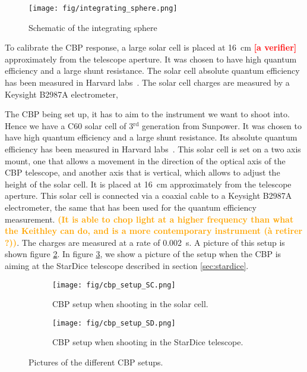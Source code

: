 \documentclass[onecolumn]{aa}
\newcommand{\todo}[1]{\textbf{\textcolor{red}{[#1]}}\xspace}
\newcommand{\com}[1]{\textbf{\textcolor{orange}{(#1)}}\xspace}
\begin{document}
\begin{figure}[h]
    \centering
    \texttt{[image: fig/integrating\_sphere.png]}
    \caption{Schematic of the integrating sphere}
    \label{fig:sphere}
\end{figure}

To calibrate the CBP response, a large solar cell is placed at \SI{16}{\cm} \todo{a verifier} approximately from the telescope aperture. It was chosen to have high quantum efficiency and a large shunt resistance. The solar cell absolute quantum efficiency has been measured in Harvard labs~\cite{solarcell}. The solar cell charges are measured by a Keysight B2987A electrometer,

The CBP being set up, it has to aim to the instrument we want to shoot into. Hence we have a C60 solar cell of 3$^{\mathrm{rd}}$ generation from Sunpower. It was chosen to have high quantum efficiency and a large shunt resistance. Its absolute quantum efficiency has been measured in Harvard labs~\cite{solarcell}. This solar cell is set on a two axis mount, one that allows a movement in the direction of the optical axis of the CBP telescope, and another axis that is vertical, which allows to adjust the height of the solar cell. It is placed at \SI{16}{\cm} approximately from the telescope aperture. This solar cell is connected via a coaxial cable to a Keysight B2987A electrometer, the same that has been used for the quantum efficiency measurement. \com{It is able to chop light at a higher frequency than what the Keithley can do, and is a more contemporary instrument (à retirer ?)}. The charges are measured at a rate of \SI{0.002}{\second}. A picture of this setup is shown figure \ref{fig:cbp_setup_sc}. In figure \ref{fig:cbp_setup_sd}, we show a picture of the setup when the CBP is aiming at the StarDice telescope described in section \ref{sec:stardice}.

\begin{figure}
  \begin{subfigure}[b]{0.5\textwidth}
    \texttt{[image: fig/cbp\_setup\_SC.png]}
    \caption{CBP setup when shooting in the solar cell.}
    \label{fig:cbp_setup_sc}
  \end{subfigure}
  \hfill %
  \begin{subfigure}[b]{0.5\textwidth}
    \texttt{[image: fig/cbp\_setup\_SD.png]}
    \caption{CBP setup when shooting in the StarDice telescope.}
    \label{fig:cbp_setup_sd}
  \end{subfigure}
\caption{Pictures of the different CBP setups.}
\label{fig:cbp_setup}
\end{figure}
\end{document}
